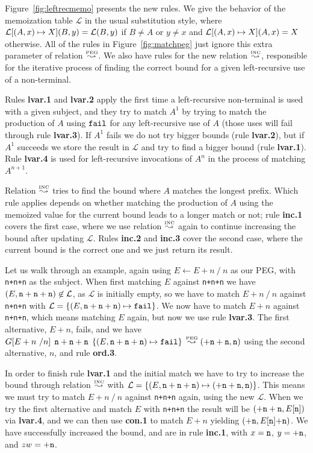 Figure~\ref{fig:leftrecmemo} presents the new rules. We give the behavior of
the memoization table $\mathcal{L}$ in the usual substitution style, where
$\mathcal{L} [(A,x) \mapsto \Anyx](B,y) = \mathcal{L}(B,y)$ if $B \neq A$ or $y \neq x$
and $\mathcal{L} [(A,x) \mapsto \Anyx](A,x) = \Anyx$ otherwise. All of
the rules in Figure~\ref{fig:matchpeg} just ignore this extra
parameter of relation $\Lp$. We also have rules for the new relation
$\Li$, responsible for the iterative process of finding the correct bound for a given
left-recursive use of a non-terminal.

Rules {\bf lvar.1} and {\bf lvar.2} apply the first time a
left-recursive non-terminal is used with a given subject, and they try
to match $A^1$ by trying to match the production of $A$ using $\Nothing$
for any left-recursive use of $A$ (those uses will fail through rule {\bf
  lvar.3}). If $A^1$ fails we do not try bigger bounds (rule {\bf
  lvar.2}), but if $A^1$ succeeds we store the result in $\mathcal{L}$ and try to
find a bigger bound (rule {\bf lvar.1}). Rule {\bf
  lvar.4} is used for left-recursive invocations of $A^n$ in the
process of matching $A^{n+1}$.

Relation $\Li$ tries to find the bound where $A$ matches the longest prefix. Which
rule applies depends on whether matching the production of $A$ using
the memoized value for the current bound leads to a longer match or
not; rule {\bf inc.1} covers the first case, where we use relation
$\Li$ again to continue increasing the bound after updating
$\mathcal{L}$. Rules {\bf inc.2} and {\bf inc.3} cover the second
case, where the current bound is the correct one and we just return
its result.

Let us walk through an example, again using $E \leftarrow E+n \ / \
n$ as our PEG, with {\tt n+n+n} as the subject. When first matching $E$ against
{\tt n+n+n} we have $(E,{\tt n+n+n}) \not\in \mathcal{L}$, as $\mathcal{L}$ is
initially empty, so we have to match $E+n \ / \ n$ against
{\tt n+n+n} with $\mathcal{L} = \{ (E,{\tt n+n+n}) \mapsto \Nothing \}$. We now
have to match $E+n$ against {\tt n+n+n}, which means matching $E$ again,
but now we use rule {\bf lvar.3}. The first alternative, $E+n$, fails,
and we have $\Matgm{E+n \ / n}{{\tt n+n+n}}{\{ (E,
  {\tt n+n+n}) \mapsto \Nothing\}} \Lp ({\tt +n+n},{\tt n})$ using the second
alternative, $n$, and rule {\bf ord.3}. 

In order to finish rule {\bf lvar.1} and the initial match we have to try
to increase the bound through relation $\Li$ with $\mathcal{L} = \{
(E,{\tt n+n+n}) \mapsto ({\tt +n+n},{\tt n}) \}$. 
This means we must try to match $E+n \ / \ n$ against {\tt n+n+n}
again, using the new $\mathcal{L}$. When we try the first alternative and match $E$ with
{\tt n+n+n} the result will be $({\tt +n+n},E[{\tt n}])$ via {\bf lvar.4}, and we can
then use {\bf con.1} to match $E+n$ yielding $({\tt +n},E[{\tt n}]{\tt
  +n})$. We have successfully increased the bound, and are in
rule {\bf inc.1}, with $x = {\tt n}$, $y = {\tt +n}$, and $zw = {\tt +n}$. 

